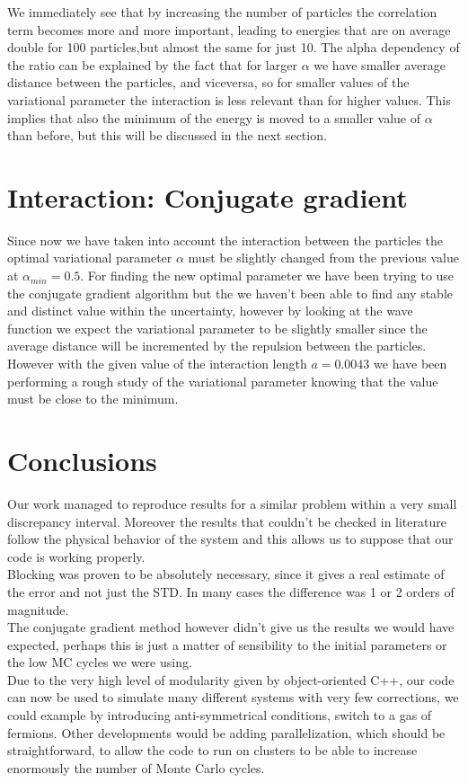 \documentclass[10pt,a4paper,titlepage]{article}
\begin{document}
We immediately see that by increasing the number of particles the correlation term becomes more and more important, leading to energies that are on average double for 100 particles,but almost the same for just 10. The alpha dependency of the ratio can be explained by the fact that for larger $\alpha$ we have smaller average distance between the particles, and viceversa, so for smaller values of the variational parameter the interaction is less relevant than for higher values. This implies that also the minimum of the energy is moved to a smaller value of $\alpha$ than before, but this will be discussed in the next section.

\section*{Interaction: Conjugate gradient}
\noindent Since now we have taken into account the interaction between the particles the optimal variational parameter $\alpha$ must be slightly changed from the previous value at $\alpha_{min}=0.5$. For finding the new optimal parameter we have been trying to use the conjugate gradient algorithm but the we haven't been able to find any stable and distinct value within the uncertainty, however by looking at the wave function we expect the variational parameter to be slightly smaller since the average distance will be incremented by the repulsion between the particles.
However with the given value of the interaction length $a=0.0043$ we have been performing a rough study of the variational parameter knowing that the value must be close to the minimum.
%
%
\section*{Conclusions}
\noindent Our work managed to reproduce results for a similar problem within a very small discrepancy interval. Moreover the results that couldn't be checked in literature follow the physical behavior of the system and this allows us to suppose that our code is working properly. \\
Blocking was proven to be absolutely necessary, since it gives a real estimate of the error and not just the STD. In many cases the difference was 1 or 2 orders of magnitude.\\
The conjugate gradient method however didn't give us the results we would have expected, perhaps this is just a matter of sensibility to the initial parameters or the low MC cycles we were using.\\
Due to the very high level of modularity given by object-oriented C++, our code can now be used to simulate many different systems with very few corrections, we could example by introducing anti-symmetrical conditions, switch to a gas of fermions. Other developments would be adding parallelization, which should be straightforward, to allow the code to run on clusters to be able to increase enormously the number of Monte Carlo cycles. 
\end{document}
